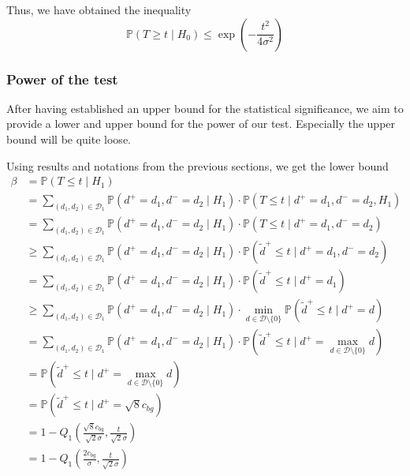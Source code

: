 \documentclass[a4paper,12pt]{article}
\theoremstyle{plain}
\theoremstyle{definition}
\theoremstyle{remark}
\begin{document}
	Thus, we have obtained the inequality
	\begin{equation}
		\mathbb{P}(T \geq t \mid H_0) \leq \exp \left( - \frac{t^2}{4 \sigma^2} \right)
	\end{equation}
	
	\subsubsection{Power of the test}
	After having established an upper bound for the statistical significance, we aim to provide a lower and upper bound for the power of our test. Especially the upper bound will be quite loose.
	
	Using results and notations from the previous sections, we get the lower bound
	\begin{align*}
		\beta &= \mathbb{P}(T \leq t \mid H_1) \\
		&= \sum_{(d_1, d_2) \in \mathcal{D}_1} \mathbb{P}(d^+ = d_1, d^- = d_2 \mid H_1) \cdot \mathbb{P}(T \leq t \mid d^+ = d_1, d^- = d_2, H_1) \\
		&= \sum_{(d_1, d_2) \in \mathcal{D}_1} \mathbb{P}(d^+ = d_1, d^- = d_2 \mid H_1) \cdot \mathbb{P}(T \leq t \mid d^+ = d_1, d^- = d_2) \\
		&\geq \sum_{(d_1, d_2) \in \mathcal{D}_1} \mathbb{P}(d^+ = d_1, d^- = d_2 \mid H_1) \cdot \mathbb{P}(\tilde{d}^+ \leq t \mid d^+ = d_1, d^- = d_2) \\
		&= \sum_{(d_1, d_2) \in \mathcal{D}_1} \mathbb{P}(d^+ = d_1, d^- = d_2 \mid H_1) \cdot \mathbb{P}(\tilde{d}^+ \leq t \mid d^+ = d_1) \\
		&\geq \sum_{(d_1, d_2) \in \mathcal{D}_1} \mathbb{P}(d^+ = d_1, d^- = d_2 \mid H_1) \cdot \min_{d \in \mathcal{D} \setminus \{ 0 \}} \mathbb{P}(\tilde{d}^+ \leq t \mid d^+ = d) \\
		&= \sum_{(d_1, d_2) \in \mathcal{D}_1} \mathbb{P}(d^+ = d_1, d^- = d_2 \mid H_1) \cdot \mathbb{P}(\tilde{d}^+ \leq t \mid d^+ = \max_{d \in \mathcal{D} \setminus \{ 0 \}} d) \\
		&= \mathbb{P}(\tilde{d}^+ \leq t \mid d^+ = \max_{d \in \mathcal{D} \setminus \{ 0 \}} d) \\
		&= \mathbb{P}(\tilde{d}^+ \leq t \mid d^+ = \sqrt{8} c_{bg}) \\
		&= 1 - Q_1 \left( \frac{\sqrt{8} c_{bg}}{\sqrt{2} \sigma}, \frac{t}{\sqrt{2} \sigma} \right) \\
		&= 1 - Q_1 \left( \frac{2 c_{bg}}{\sigma}, \frac{t}{\sqrt{2} \sigma} \right)
	\end{align*}
	
\end{document}
